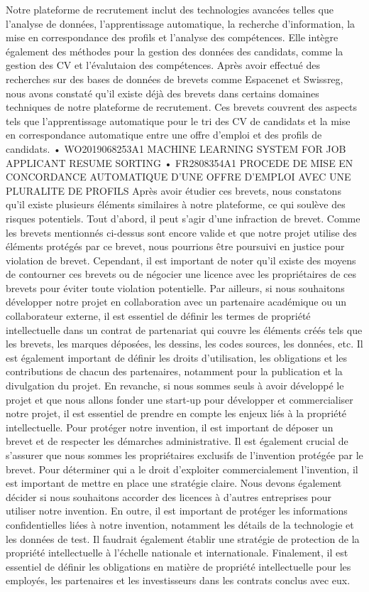 Notre plateforme de recrutement inclut des technologies avancées telles que l’analyse de données, l’apprentissage automatique, la recherche d’information, la mise en correspondance des profils et l’analyse des compétences. Elle intègre également des méthodes pour la gestion des données des candidats, comme la gestion des CV et l’évalutaion des compétences.
Après avoir effectué des recherches sur des bases de données de brevets comme Espacenet et Swissreg, nous avons constaté qu'il existe déjà des brevets dans certains domaines techniques de notre plateforme de recrutement. Ces brevets couvrent des aspects tels que l'apprentissage automatique pour le tri des CV de candidats et la mise en correspondance automatique entre une offre d'emploi et des profils de candidats.
•	WO2019068253A1 MACHINE LEARNING SYSTEM FOR JOB APPLICANT RESUME SORTING
•	FR2808354A1 PROCEDE DE MISE EN CONCORDANCE AUTOMATIQUE D'UNE OFFRE D'EMPLOI AVEC UNE PLURALITE DE PROFILS
Après avoir étudier ces  brevets, nous constatons qu’il existe plusieurs éléments similaires à notre plateforme, ce qui soulève des risques potentiels.
Tout d’abord, il peut s’agir d’une infraction de brevet. Comme les brevets mentionnés ci-dessus sont encore valide et que notre projet utilise des éléments protégés par ce brevet, nous pourrions être poursuivi en justice pour violation de brevet. 
Cependant, il est important de noter qu'il existe des moyens de contourner ces brevets ou de négocier une licence avec les propriétaires de ces brevets pour éviter toute violation potentielle. 
Par ailleurs, si nous souhaitons développer notre projet en collaboration avec un partenaire académique ou un collaborateur externe, il est essentiel de définir les termes de propriété intellectuelle dans un contrat de partenariat qui couvre les éléments créés tels que les brevets, les marques déposées, les dessins, les codes sources, les données, etc. Il est également important de définir les droits d'utilisation, les obligations et les contributions de chacun des partenaires, notamment pour la publication et la divulgation du projet.
En revanche, si nous sommes seuls à avoir développé le projet et que nous allons fonder une start-up pour développer et commercialiser notre projet, il est essentiel de prendre en compte les enjeux liés à la propriété intellectuelle. Pour protéger notre invention, il est important de déposer un brevet et de  respecter les démarches administrative. Il est également crucial de s'assurer que nous sommes les propriétaires exclusifs de l'invention protégée par le brevet. Pour déterminer qui a le droit d'exploiter commercialement l'invention, il est important de mettre en place une stratégie claire. Nous devons également décider si nous souhaitons accorder des licences à d'autres entreprises pour utiliser notre invention.
 En outre, il est important de protéger les informations confidentielles liées à notre invention, notamment les détails de la technologie et les données de test. Il faudrait également établir une stratégie de protection de la propriété intellectuelle à l'échelle nationale et internationale. Finalement, il est essentiel de définir les obligations en matière de propriété intellectuelle pour les employés, les partenaires et les investisseurs dans les contrats conclus avec eux.

